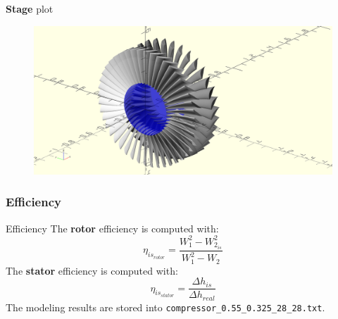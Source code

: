 	\begin{frame}{\textbf{Stage} plot}
		\begin{figure}
			\centering
			\includegraphics[width=1\textwidth]{figures/compressor.png}
		\end{figure}
	\end{frame}

\subsubsection{Efficiency}
	\begin{frame}[fragile]{Efficiency}
		The \textbf{rotor} efficiency is computed with:
		\begin{equation}
			\eta_{is_{rotor}} = \frac{W_1^2 - W_{2_{is}}^2}{W_1^2 - W_{2}} \nonumber 
		\end{equation}
		The \textbf{stator} efficiency is computed with:
		\begin{equation}
			\eta_{is_{stator}} = \frac{\Delta h_{is}}{\Delta h_{real}}
			\nonumber 
		\end{equation}
		The modeling results are stored into \verb|compressor_0.55_0.325_28_28.txt|.
	\end{frame}
